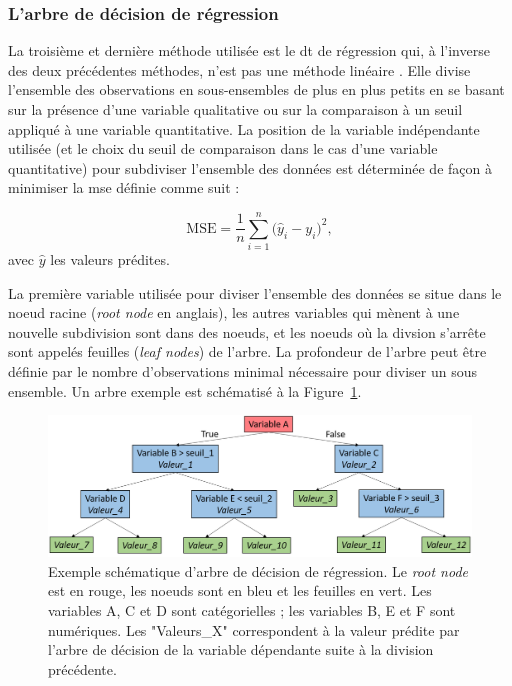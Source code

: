 \subsubsection{L'arbre de décision de régression}

La troisième et dernière méthode utilisée est le \gls{dt} de régression qui, à l'inverse des deux précédentes méthodes, n'est pas une méthode 
linéaire \citep{Quinlan1986}. Elle divise l'ensemble des observations en sous-ensembles de plus en plus petits en se basant sur la présence 
d'une variable qualitative ou sur la comparaison à un seuil appliqué à une variable quantitative. La position de la variable indépendante utilisée (et le
choix du seuil de comparaison dans le cas d'une variable quantitative) pour subdiviser l'ensemble des données est déterminée de façon à minimiser la
\gls{mse} définie comme suit :

\begin{equation}
\label{eq:factors_decision_tree_mse}
\text{MSE} = \frac{1}{n}\sum_{i=1}^{n} \Big(\hat{y}_i - {y}_i\Big)^2,
\end{equation}
avec $\hat{y}$ les valeurs prédites.

La première variable utilisée pour diviser l'ensemble des données se situe dans le noeud racine (\textit{root node} en anglais), les autres
variables qui mènent à une nouvelle subdivision sont dans des noeuds, et les noeuds où la divsion s'arrête sont appelés
feuilles (\textit{leaf nodes}) de l'arbre. La profondeur de l'arbre peut être définie par le nombre d'observations minimal nécessaire
pour diviser un sous ensemble. Un arbre exemple est schématisé à la Figure~\ref{Figure:factors_decision_tree_example}.

\begin{figure}[h!]
  \centering
	\includegraphics[width=1.0\linewidth]{figures/chapter-3/decision-tree-example} 
  \caption{Exemple schématique d'arbre de décision de régression. Le \textit{root node} est en rouge, les noeuds sont en bleu et les feuilles en vert. 
	Les variables A, C et D sont catégorielles ; les variables B, E et F sont numériques. Les "Valeurs\_X" correspondent à la valeur 
	prédite par l'arbre de décision de la variable dépendante suite à la division précédente.}
  \label{Figure:factors_decision_tree_example}
\end{figure}

